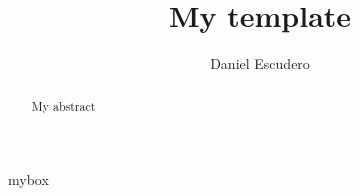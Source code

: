 \documentclass[
draft=false,
fontsize=10pt,
titlepage=false,
abstract=true, %
parskip=half, %
footnotes=multiple, %
%
DIV=10, %
twoside=false,
twocolumn=false,
headinclude=false,
footinclude=false, %
headsepline=fale,
footsepline=false, %
%
]{scrartcl} %
\title{My template}
\author{Daniel Escudero}
\date{}
\begin{document}
 
\maketitle 

\begin{abstract}
  My abstract
\end{abstract}

\begin{mybox}{mybox}
  \blindtext
\end{mybox}
\Blinddocument
\end{document}
